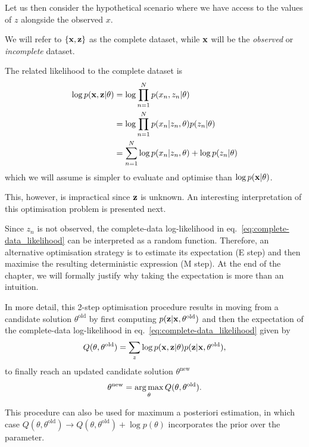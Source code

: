Let us then consider the hypothetical scenario where we have access to the values of $z$ alongside the observed $x$. 

\begin{definition}
    We will refer to $\{{ \mathbf{x}},{ \mathbf{z}}\}$ as the complete dataset, while ${ \mathbf{x}}$ will be the \emph{observed} or \emph{incomplete} dataset. 
\end{definition}

The related likelihood  to the complete dataset is 
\begin{align}
    \log p({ \mathbf{x}},{ \mathbf{z}}|\theta) 
    &= \log \prod_{n=1}^{N} p(x_n,z_n|\theta)\\
    &= \log \prod_{n=1}^{N} p(x_n|z_n,\theta)p(z_n|\theta)\\
    &= \sum_{n=1}^{N} \log  p(x_n|z_n,\theta)  +  \log p(z_n|\theta)\label{eq:complete-data_likelihood}
\end{align}
which we will assume is simpler to evaluate and  optimise than $\log p({ \mathbf{x}}|\theta)$.

This, however, is impractical since ${ \mathbf{z}}$ is unknown. An interesting interpretation of this optimisation problem is presented next.

\begin{remark}
    Since $z_n$ is not observed, the complete-data log-likelihood in eq.~\eqref{eq:complete-data_likelihood} can be interpreted as a random function. Therefore, an alternative optimisation strategy is to estimate its expectation (E step) and then maximise the resulting deterministic expression (M step). At the end of the chapter, we will formally justify why taking the expectation is more than an intuition. 
\end{remark}

In more detail, this 2-step optimisation procedure results in moving from a candidate solution $\theta^\text{old}$ by first computing $p({ \mathbf{z}}|{ \mathbf{x}},\theta^\text{old})$ and then the expectation of the complete-data log-likelihood in eq.~\eqref{eq:complete-data_likelihood} given by 
\begin{equation}
    Q(\theta,\theta^\text{old}) = \sum_{z} \log p({ \mathbf{x}},{ \mathbf{z}}|\theta) p({ \mathbf{z}}|{ \mathbf{x}}, \theta^\text{old}),
\end{equation}
to finally reach an updated candidate solution $\theta^\text{new}$
\begin{equation}
    \theta^\text{new} =  \operatorname*{arg\,max}_\theta  Q(\theta,\theta^\text{old}).
\end{equation} 

\begin{remark}
    This procedure can also be used for maximum a posteriori estimation, in which case $  Q(\theta,\theta^\text{old}) \to   Q(\theta,\theta^\text{old}) + \log p(\theta)$ incorporates the prior over the parameter. 
\end{remark}

